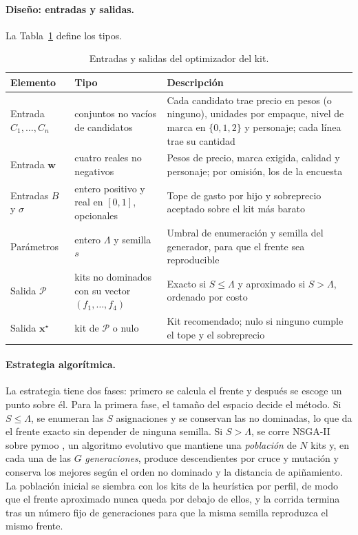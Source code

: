 \paragraph{Diseño: entradas y salidas.} La Tabla~\ref{tab:es-optimizador} define los tipos.

\begin{table}[H]
\centering\footnotesize
\caption{Entradas y salidas del optimizador del kit.}
\label{tab:es-optimizador}
\begin{tabularx}{\textwidth}{@{}p{2.6cm}p{4.4cm}X@{}}
\toprule
Elemento & Tipo & Descripción \\
\midrule
Entrada $C_1,\dots,C_n$ & conjuntos no vacíos de candidatos & Cada candidato trae precio en pesos (o ninguno), unidades por empaque, nivel de marca en $\{0,1,2\}$ y personaje; cada línea trae su cantidad \\
Entrada $\mathbf{w}$ & cuatro reales no negativos & Pesos de precio, marca exigida, calidad y personaje; por omisión, los de la encuesta \\
Entradas $B$ y $\sigma$ & entero positivo y real en $[0,1]$, opcionales & Tope de gasto por hijo y sobreprecio aceptado sobre el kit más barato \\
Parámetros & entero $\Lambda$ y semilla $s$ & Umbral de enumeración y semilla del generador, para que el frente sea reproducible \\
Salida $\mathcal{P}$ & kits no dominados con su vector $(f_1,\dots,f_4)$ & Exacto si $S\leq\Lambda$ y aproximado si $S>\Lambda$, ordenado por costo \\
Salida $\mathbf{x}^\star$ & kit de $\mathcal{P}$ o nulo & Kit recomendado; nulo si ninguno cumple el tope y el sobreprecio \\
\bottomrule
\end{tabularx}
\end{table}

\paragraph{Estrategia algorítmica.} La estrategia tiene dos fases: primero se calcula el frente y
después se escoge un punto sobre él. Para la primera fase, el tamaño del espacio decide el método.
Si $S\leq\Lambda$, se enumeran las $S$ asignaciones y se conservan las no dominadas, lo que da el
frente exacto sin depender de ninguna semilla. Si $S>\Lambda$, se corre NSGA-II
\citep{deb_fast_2002} sobre pymoo \citep{blank_pymoo_2020}, un algoritmo evolutivo que mantiene una
\emph{población} de $N$ kits y, en cada una de las $G$ \emph{generaciones}, produce descendientes
por cruce y mutación y conserva los mejores según el orden no dominado y la distancia de
apiñamiento. La población inicial se siembra con los kits de la heurística por perfil, de modo que
el frente aproximado nunca queda por debajo de ellos, y la corrida termina tras un número fijo de
generaciones para que la misma semilla reproduzca el mismo frente.

